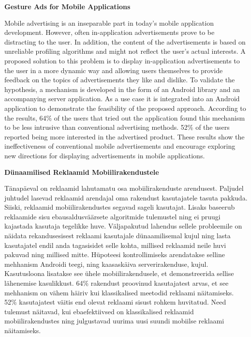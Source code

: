 \noindent\textbf{\large Gesture Ads for Mobile Applications}
\vspace*{2ex}
{}

\noindent Mobile advertising is an inseparable part in today's mobile application development. However, often in-application advertisements prove to be distracting to the user. In addition, the content of the advertisements is based on unreliable profiling algorithms and might not reflect the user's actual interests.
A proposed solution to this problem is to display in-application advertisements to the user in a more dynamic way and allowing users themselves to provide feedback on the topics of advertisements they like and dislike.
To validate the hypothesis, a mechanism is developed in the form of an Android library and an accompanying server application. As a use case it is integrated into an Android application to demonstrate the feasibility of the proposed approach.
According to the results, 64\% of the users that tried out the application found this mechanism to be less intrusive than conventional advertising methods. 52\% of the users reported being more interested in the advertised product.
These results show the ineffectiveness of conventional mobile advertisements and encourage exploring new directions for displaying advertisements in mobile applications.

\vspace*{2ex}

{}

\vspace*{3ex}

\noindent\textbf{\large D\"{u}naamilised Reklaamid Mobiilirakendustele}
\vspace*{2ex}
{}

\noindent T\"{a}nap\"{a}eval on reklaamid lahutamatu osa mobiilirakenduste arendusest. Paljudel juhtudel lasevad reklaamid arendajal oma rakendust kasutajatele tasuta pakkuda. Siiski, reklaamid mobiilirakendustes segavad sageli kasutajat. Lisaks baseerub reklaamide sisu ebausaldusv\"{a}\"{a}rsete algoritmide tulemustel ning ei pruugi kajastada kasutaja tegelikke huve.
V\"{a}ljapakutud lahendus sellele probleemile on n\"{a}idata rekandusesisest reklaami kasutajale d\"{u}naamilisemal kujul ning lasta kasutajatel endil anda tagasisidet selle kohta, millised reklaamid neile huvi pakuvad ning millised mitte.
H\"{u}poteesi kontrollimiseks arendatakse selline mehhanism Androidi teegi, ning kaasask\"{a}iva serverirakenduse, kujul. Kasutusloona lisatakse see \"{u}hele mobiilirakendusele, et demonstreerida sellise l\"{a}henemise kasulikkust.
64\% rakendust proovinud kasutajatest arvas, et see mehhanism on v\"{a}hem h\"{a}iriv kui klassikalised meetodid reklaami n\"{a}itamiseks. 52\% kasutajatest v\"{a}itis end olevat reklaami sisust rohkem huvitatud.
Need tulemust n\"{a}itavad, kui ebaefektiivsed on klassikalised reklaamid mobiilirakendustes ning julgustavad uurima uusi suundi mobiilse reklaami n\"{a}itamiseks.

\vspace*{2ex}

{}